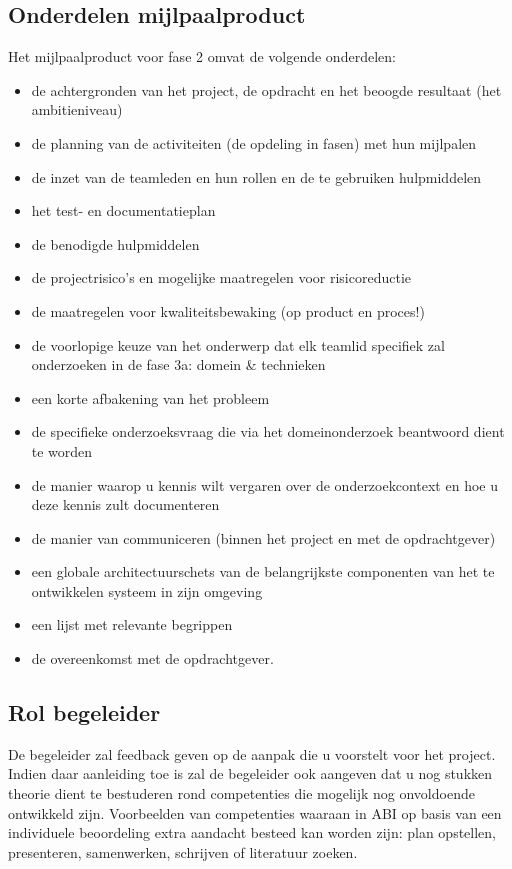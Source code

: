 \subsection{Onderdelen mijlpaalproduct}
    Het mijlpaalproduct voor fase 2 omvat de volgende onderdelen:
{
\begin{itemize}
    \item de achtergronden van het project, de opdracht en het beoogde resultaat
(het ambitieniveau)
    \item de planning van de activiteiten (de opdeling in fasen) met hun mijlpalen
    \item de inzet van de teamleden en hun rollen en de te gebruiken hulpmiddelen
    \item het test- en documentatieplan
    \item de benodigde hulpmiddelen
    \item de projectrisico’s en mogelijke maatregelen voor risicoreductie
    \item de maatregelen voor kwaliteitsbewaking (op product en proces!)
    \item de voorlopige keuze van het onderwerp dat elk teamlid specifiek zal
	    onderzoeken in de fase 3a: domein \& technieken
    \item een korte afbakening van het probleem
    \item de specifieke onderzoeksvraag die via het domeinonderzoek beantwoord
	    dient te worden
    \item de manier waarop u kennis wilt vergaren over de onderzoekcontext en hoe
	    u deze kennis zult documenteren
    \item de manier van communiceren (binnen het project en met de opdrachtgever)
    \item een globale architectuurschets van de belangrijkste componenten van het
	    te ontwikkelen systeem in zijn omgeving
    \item een lijst met relevante begrippen
    \item de overeenkomst met de opdrachtgever.
\end{itemize}
}

\subsection{Rol begeleider}
    De begeleider zal feedback geven op de aanpak die u voorstelt voor het
project. Indien daar aanleiding toe is zal de begeleider ook aangeven dat u nog
stukken theorie dient te bestuderen rond competenties die mogelijk nog
onvoldoende ontwikkeld zijn. Voorbeelden van competenties waaraan in ABI op
basis van een individuele beoordeling extra aandacht besteed kan worden zijn:
plan opstellen, presenteren, samenwerken, schrijven of literatuur zoeken.

